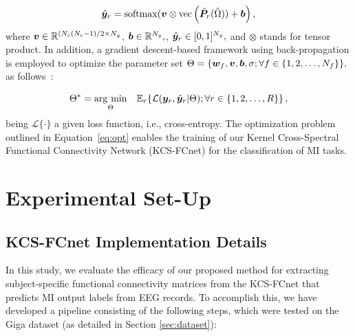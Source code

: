 	
	\begin{equation}\label{eq:output}
		\hat{\bm {y}}_r = {\rm{softmax}}(\bm {v}\otimes{\rm{vec}}\left(\tilde{\bm {P}}_r(\hat{\Omega}))+\bm {b}\right), 
	\end{equation}
	where $\bm {v}\in \mathbb{R}^{(N_c(N_c-1)/2\times N_y}$, $\bm {b} \in \mathbb{R}^{N_y},$, $\hat{\bm {y}}_r\in[0,1]^{N_y},$ and $\otimes$ stands for tensor product. In addition, a gradient descent-based framework using back-propagation is employed to optimize the parameter set $\Theta=\{\bm {w}_f,\bm {v},\bm {b},\sigma;\forall f\in\{1,2,\dots,N_f\}\},$ as follows~\cite{zhang2021dive}:
	
	\begin{equation}\label{eq:opt}
		\Theta^{*} = \underset{\Theta}{\arg\,\min} \quad \mathbb{E}_{r}\!\left\{\mathcal{L}(\bm {y}_r,\hat{\bm {y}}_r|\Theta); \forall r\in\{1,2,\dots,R\}\right\},
	\end{equation}
	being $\mathcal{L} \{\cdot\}$ a given loss function, i.e., cross-entropy. The optimization problem outlined in Equation~\eqref{eq:opt} enables the training of our Kernel Cross-Spectral Functional Connectivity Network (KCS-FCnet) for the classification of MI tasks. 


\section{Experimental Set-Up} \label{sec:Experiment}

\subsection{KCS-FCnet Implementation Details}

In this study, we evaluate the efficacy of our proposed method for extracting subject-specific functional connectivity matrices from the KCS-FCnet that predicts MI output labels from EEG records. To accomplish this, we have developed a pipeline consisting of the following steps, which were tested on the Giga dataset (as detailed in Section \ref{sec:dataset}): 

